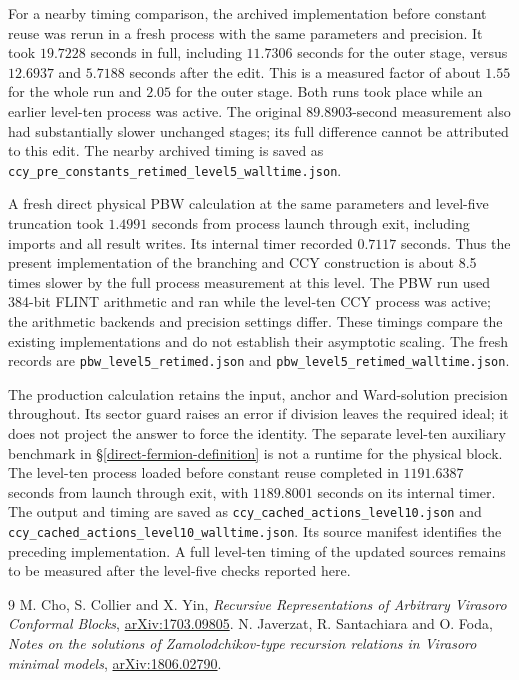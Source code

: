 \documentclass[12pt]{article}
\numberwithin{equation}{section}
\begin{document}
For a nearby timing comparison, the archived implementation before
constant reuse was rerun in a fresh process with the same parameters
and precision.  It took $19.7228$ seconds in full, including $11.7306$
seconds for the outer stage, versus $12.6937$ and $5.7188$ seconds after
the edit.  This is a measured factor of about $1.55$ for the whole run
and $2.05$ for the outer stage.  Both runs took place while an earlier
level-ten process was active.  The original $89.8903$-second measurement
also had substantially slower unchanged stages; its full difference
cannot be attributed to this edit.  The nearby archived timing is saved
as \texttt{ccy\_pre\_constants\_retimed\_level5\_walltime.json}.

A fresh direct physical PBW calculation at the same parameters and
level-five truncation took $1.4991$ seconds from process launch through
exit, including imports and all result writes.  Its internal timer
recorded $0.7117$ seconds.  Thus the present implementation of the
branching and CCY construction is about 8.5 times slower by the full
process measurement at this level.  The PBW run used 384-bit FLINT
arithmetic and ran while the level-ten CCY process was active; the
arithmetic backends and precision settings differ.  These timings
compare the existing implementations and do not establish their
asymptotic scaling.  The fresh records are
\texttt{pbw\_level5\_retimed.json} and
\texttt{pbw\_level5\_retimed\_walltime.json}.

The production calculation retains the input, anchor and Ward-solution
precision throughout.  Its sector guard raises an error if division
leaves the required ideal; it does not project the answer to force the
identity.  The separate level-ten auxiliary benchmark in
\S\ref{direct-fermion-definition} is not a runtime for the physical
block.  The level-ten process loaded before constant reuse completed
in $1191.6387$ seconds from launch through exit, with $1189.8001$ seconds
on its internal timer.  The output and timing are saved as
\texttt{ccy\_cached\_actions\_level10.json} and
\texttt{ccy\_cached\_actions\_level10\_walltime.json}.  Its source
manifest identifies the preceding implementation.  A full level-ten
timing of the updated sources remains to be measured after the
level-five checks reported here.

\begin{thebibliography}{9}
M. Cho, S. Collier and X. Yin, \emph{Recursive Representations of
Arbitrary Virasoro Conformal Blocks},
\href{https://arxiv.org/abs/1703.09805}{arXiv:1703.09805}.
N. Javerzat, R. Santachiara and O. Foda, \emph{Notes on the solutions
of Zamolodchikov-type recursion relations in Virasoro minimal models},
\href{https://arxiv.org/abs/1806.02790}{arXiv:1806.02790}.
\end{thebibliography}
\end{document}
